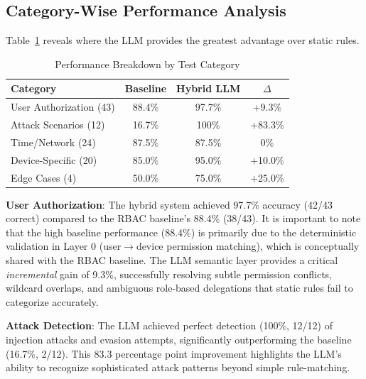 \documentclass[conference]{IEEEtran}
\begin{document}
\subsection{Category-Wise Performance Analysis}

Table~\ref{tab:categories} reveals where the LLM provides the greatest advantage over static rules.

\begin{table}[h]
    \caption{Performance Breakdown by Test Category}
    \label{tab:categories}
    \begin{center}
        \begin{tabular}{lccc}
            \toprule
            \textbf{Category}       & \textbf{Baseline} & \textbf{Hybrid LLM} & \textbf{$\Delta$} \\
            \midrule
            User Authorization (43) & 88.4\%            & 97.7\%              & +9.3\%            \\
            Attack Scenarios (12)   & 16.7\%            & 100\%               & +83.3\%           \\
            Time/Network (24)       & 87.5\%            & 87.5\%              & 0\%               \\
            Device-Specific (20)    & 85.0\%            & 95.0\%              & +10.0\%           \\
            Edge Cases (4)          & 50.0\%            & 75.0\%              & +25.0\%           \\
            \bottomrule
        \end{tabular}
    \end{center}
\end{table}

\textbf{User Authorization}: The hybrid system achieved 97.7\% accuracy (42/43 correct) compared to the RBAC baseline's 88.4\% (38/43). It is important to note that the high baseline performance (88.4\%) is primarily due to the deterministic validation in Layer 0 (user$\rightarrow$device permission matching), which is conceptually shared with the RBAC baseline. The LLM semantic layer provides a critical \textit{incremental} gain of 9.3\%, successfully resolving subtle permission conflicts, wildcard overlaps, and ambiguous role-based delegations that static rules fail to categorize accurately.

\textbf{Attack Detection}: The LLM achieved perfect detection (100\%, 12/12) of injection attacks and evasion attempts, significantly outperforming the baseline (16.7\%, 2/12). This 83.3 percentage point improvement highlights the LLM's ability to recognize sophisticated attack patterns beyond simple rule-matching.
\end{document}
